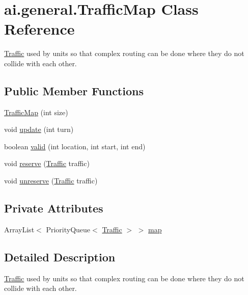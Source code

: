 \hypertarget{classai_1_1general_1_1_traffic_map}{
\section{ai.general.TrafficMap Class Reference}
\label{classai_1_1general_1_1_traffic_map}
}


\hyperlink{classai_1_1general_1_1_traffic}{Traffic} used by units so that complex routing can be done where they do not collide with each other.  


\subsection*{Public Member Functions}
\begin{DoxyCompactItemize}
\item 
\hyperlink{classai_1_1general_1_1_traffic_map_af3c68c5f92ec3b47dd04d920566d59f7}{TrafficMap} (int size)
\item 
void \hyperlink{classai_1_1general_1_1_traffic_map_a2770c017d7385af00720130aedfd8637}{update} (int turn)
\item 
boolean \hyperlink{classai_1_1general_1_1_traffic_map_af4e1835407fde3c85731800f8b3d2bb6}{valid} (int location, int start, int end)
\item 
void \hyperlink{classai_1_1general_1_1_traffic_map_a94b72014fa333c1f4c0fb9130ecc2602}{reserve} (\hyperlink{classai_1_1general_1_1_traffic}{Traffic} traffic)
\item 
void \hyperlink{classai_1_1general_1_1_traffic_map_af703e6c5e5d8726e2b711612dc4ca7b8}{unreserve} (\hyperlink{classai_1_1general_1_1_traffic}{Traffic} traffic)
\end{DoxyCompactItemize}
\subsection*{Private Attributes}
\begin{DoxyCompactItemize}
\item 
ArrayList$<$ PriorityQueue$<$ \hyperlink{classai_1_1general_1_1_traffic}{Traffic} $>$ $>$ \hyperlink{classai_1_1general_1_1_traffic_map_a92a9a57fa9701020b97a0a369df4143f}{map}
\end{DoxyCompactItemize}


\subsection{Detailed Description}
\hyperlink{classai_1_1general_1_1_traffic}{Traffic} used by units so that complex routing can be done where they do not collide with each other. 

